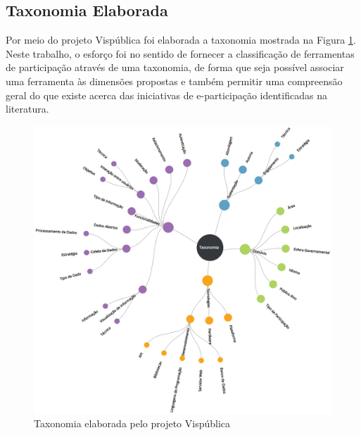 \subsection{Taxonomia Elaborada}
\label{subsec:taxonomiaElaborada}
\par
Por meio do projeto Vispública foi elaborada a taxonomia mostrada na Figura \ref{fig:taxonomia-vispublica}. Neste trabalho, o esforço foi no sentido de fornecer a classificação de
ferramentas de participação através de uma taxonomia, de forma que seja possível associar uma ferramenta às dimensões propostas e também permitir uma compreensão
geral do que existe acerca das iniciativas de e-participação identificadas na literatura.

\begin{figure}[!ht]
    \centering
    \includegraphics[scale=0.3]{./figuras/taxonomia-cropped.png}
    \caption{Taxonomia elaborada pelo projeto Vispública}
    \label{fig:taxonomia-vispublica}
\end{figure}

